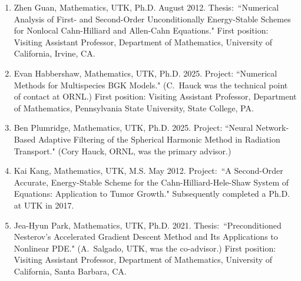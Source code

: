 \documentclass[10pt,letterpaper]{article}
\newcommand{\cvsubsection}[1]{%
  \par\vspace{8pt}{\color{Smokey}\fontsize{12}{14}\selectfont\bfseries #1}\par\vspace{2pt}%
}
\begin{document}
\begin{enumerate}[itemsep=3pt,topsep=3pt]
Stephen Galloway, Mathematics, UTK, Ph.D. 2020. Thesis:~``Graphene Formation Using the PFC Model with a Vapor Phase." First position: Assistant Professor, Department of Mathematics, St.~Andrews University, Laurinburg, NC.
	\item
Zhen Guan, Mathematics, UTK, Ph.D. August 2012. Thesis:~``Numerical Analysis of First- and Second-Order Unconditionally Energy-Stable Schemes for Nonlocal Cahn-Hilliard and Allen-Cahn Equations." First position: Visiting Assistant Professor, Department of Mathematics, University of California, Irvine, CA.
	\item
Evan Habbershaw, Mathematics, UTK, Ph.D. 2025. Project: ``Numerical Methods for Multispecies BGK Models." (C.~Hauck was the technical point of contact at ORNL.) First position: Visiting Assistant Professor, Department of Mathematics, Pennsylvania State University, State College, PA.
	\item
Ben Plumridge, Mathematics, UTK, Ph.D. 2025. Project: ``Neural Network-Based Adaptive Filtering of the Spherical Harmonic Method in Radiation Transport." (Cory Hauck, ORNL, was the primary advisor.)

	\item
Kai Kang, Mathematics, UTK, M.S. May 2012. Project:~``A Second-Order Accurate, Energy-Stable Scheme for the Cahn-Hilliard-Hele-Shaw System of Equations: Application to Tumor Growth." Subsequently completed a Ph.D. at UTK in 2017.

	\item
Jea-Hyun Park, Mathematics, UTK, Ph.D. 2021. Thesis:~``Preconditioned Nesterov's Accelerated Gradient Descent Method and Its Applications to Nonlinear PDE." (A.~Salgado, UTK, was the co-advisor.) First position: Visiting Assistant Professor, Department of Mathematics, University of California, Santa Barbara, CA.
	\end{enumerate}
\cvsubsection{Current (Alphabetical by Last Name)}
\end{document}
